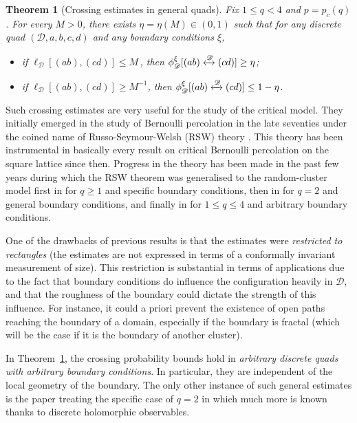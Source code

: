 \documentclass[a4paper,oneside,11pt]{article}
\newtheorem{theorem}{Theorem}[section]
\numberwithin{equation}{section}
\numberwithin{equation}{section}
\numberwithin{equation}{section}
\newcommand{\calD}{\mathcal{D}}
\begin{document}
 
\begin{theorem}[Crossing estimates in general quads]\label{thm:sRSW}\label{thm:RSWquads}
Fix  $1\le q< 4$ and $p=p_c(q)$. For every $M>0$, there exists
$\eta=\eta(M)\in (0,1)$ such that for any discrete quad $\left(\calD,a,b,c,d\right)$ and any boundary conditions $\xi$,
\smallbreak
\begin{itemize}
\item if $\ell_{\calD}\left[\left(ab\right),\left(cd\right)\right] \leq M$\,, then $\mathbb{\phi}_{\calD}^{\xi}[\left(ab\right)\xleftrightarrow{\calD}\left(cd\right)] \geq \eta$;
\item if $\ell_{\calD}\left[\left(ab\right),\left(cd\right)\right] \geq M^{-1}$, then $\mathbb{\phi}_{\calD}^{\xi}[\left(ab\right)\xleftrightarrow{\calD}\left(cd\right)] \leq 1-\eta$.
\end{itemize}
\end{theorem}

Such crossing estimates are very useful for the study of the critical model. They initially emerged in the study of Bernoulli percolation in the late seventies under the coined name of Russo-Seymour-Welsh (RSW) theory \cite{Rus78,SeyWel78}. This theory has been instrumental in basically every result on critical Bernoulli percolation on the square lattice since then. Progress in the theory has been made in the past few years during which the RSW theorem was generalised to the random-cluster model first in \cite{BefDum12} for $q\ge1$ and specific boundary conditions, then in \cite{DumHonNol11} for $q=2$ and general boundary conditions, and finally in \cite{DumSidTas16} for $1\le q\le 4$ and arbitrary boundary conditions. 

One of the drawbacks of previous results is that the estimates were {\em restricted to rectangles} (the estimates are not expressed in terms of a conformally invariant measurement of size). This restriction is substantial in terms of applications due to the fact that boundary conditions do influence the configuration heavily in $\calD$, and that the roughness of the boundary could dictate the strength of this influence. For instance, it could a priori prevent the existence of open paths reaching the boundary of a domain, especially if the boundary is fractal (which will be the case if it is the boundary of another cluster). 


In Theorem~\ref{thm:sRSW}, the crossing probability  bounds hold in \emph{arbitrary discrete quads with arbitrary boundary conditions}. In particular, they are independent
of the local geometry of the boundary. The  only other instance of such general estimates is the paper \cite{CheDumHon13} treating the specific case of $q=2$ in which much more is known thanks to discrete holomorphic observables. 
\end{document}
